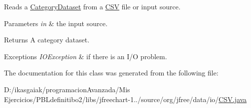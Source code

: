 Reads a \mbox{\hyperlink{}{Category\+Dataset}} from a \mbox{\hyperlink{classorg_1_1jfree_1_1data_1_1io_1_1_c_s_v}{C\+SV}} file or input source.


\begin{DoxyParams}{Parameters}
{\em in} & the input source.\\
\hline
\end{DoxyParams}
\begin{DoxyReturn}{Returns}
A category dataset.
\end{DoxyReturn}

\begin{DoxyExceptions}{Exceptions}
{\em I\+O\+Exception} & if there is an I/O problem. \\
\hline
\end{DoxyExceptions}


The documentation for this class was generated from the following file\+:\begin{DoxyCompactItemize}
\item 
D\+:/ikasgaiak/programacion\+Avanzada/\+Mis Ejercicios/\+P\+B\+Ldefinitibo2/libs/jfreechart-\/1../source/org/jfree/data/io/\mbox{\hyperlink{_c_s_v_8java}{C\+S\+V.\+java}}\end{DoxyCompactItemize}
